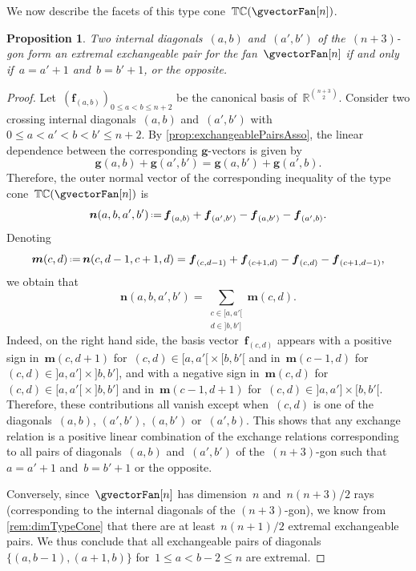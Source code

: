 \documentclass{amsart}
\newtheorem{proposition}[theorem]{Proposition}
\theoremstyle{definition}
\newcommand{\R}{\mathbb{R}} %
\renewcommand{\b}[1]{{\boldsymbol{#1}}} %
\newcommand{\eqdef}{\mbox{\,\raisebox{0.2ex}{\scriptsize\ensuremath{\mathrm:}}\ensuremath{=}\,}} %
\newcommand{\gvector}[1]{\b{g}(#1)} %
\newcommand{\typeCone}{\mathbb{TC}} %
\begin{document}
We now describe the facets of this type cone~$\typeCone(\gvectorFan[n])$.

\begin{proposition}
\label{prop:extremalExchangeablePairsAsso}
Two internal diagonals~$(a,b)$ and~$(a',b')$ of the~$(n+3)$-gon form an extremal exchangeable pair for the fan~$\gvectorFan[n]$ if and only if~$a = a'+1$ and~$b = b'+1$, or the opposite.
\end{proposition}

\begin{proof}
Let~$(\b{f}_{(a,b)})_{0 \le a < b \le n+2}$ be the canonical basis of~$\R^{\binom{n+3}{2}}$.
Consider two crossing internal diagonals~$(a,b)$ and~$(a',b')$ with~$0 \le a < a' < b < b' \le n+2$.
By \cref{prop:exchangeablePairsAsso}, the linear dependence between the corresponding $\b{g}$-vectors is given by
\[
\gvector{a,b} + \gvector{a',b'} = \gvector{a,b'} + \gvector{a',b}.
\]
Therefore, the outer normal vector of the corresponding inequality of the type cone~$\typeCone(\gvectorFan[n])$ is
\[
\b{n}(a,b,a',b') \eqdef \b{f}_{(a,b)} + \b{f}_{(a',b')} - \b{f}_{(a,b')} - \b{f}_{(a',b)}.
\]
Denoting
\[
\b{m}(c,d) \eqdef \b{n}(c,d-1,c+1,d) = \b{f}_{(c,d-1)} + \b{f}_{(c+1,d)} - \b{f}_{(c,d)} - \b{f}_{(c+1,d-1)},
\]
we obtain that
\[
\b{n}(a,b,a',b') = \sum_{\substack{c \in {[a,a'[} \\ d \in {]b,b']}}} \b{m}(c,d).
\]
Indeed, on the right hand side, the basis vector~$\b{f}_{(c,d)}$ appears with a positive sign in~$\b{m}(c,d+1)$ for~$(c,d) \in {[a,a'[} \times {[b,b'[}$ and in~$\b{m}(c-1,d)$ for~$(c,d) \in {]a,a']} \times {]b,b']}$, and with a negative sign in~$\b{m}(c,d)$ for~$(c,d) \in {[a,a'[} \times {]b,b']}$ and in~$\b{m}(c-1,d+1)$ for~$(c,d) \in {]a,a']} \times {[b,b'[}$.
Therefore, these contributions all vanish except when~$(c,d)$ is one of the diagonals~$(a,b)$, $(a',b')$, $(a,b')$ or~$(a',b)$.
This shows that any exchange relation is a positive linear combination of the exchange relations corresponding to all pairs of diagonals~$(a,b)$ and~$(a',b')$ of the~$(n+3)$-gon such that~$a = a'+1$ and~$b = b'+1$ or the opposite.

Conversely, since~$\gvectorFan[n]$ has dimension~$n$ and~$n(n+3)/2$ rays (corresponding to the internal diagonals of the $(n+3)$-gon), we know from \cref{rem:dimTypeCone} that there are at least~$n(n+1)/2$ extremal exchangeable pairs. We thus conclude that all exchangeable pairs of diagonals~$\{(a,b-1), (a+1,b)\}$ for~$1 \le a < b-2 \le n$ are extremal.
\end{proof}
\end{document}
